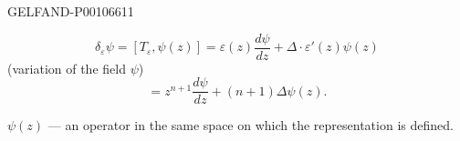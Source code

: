 \begin{GelfandAdjacentEvidence}{GELFAND-P001066}{11}

\begin{equation*}
\delta_\varepsilon\psi=[T_\varepsilon,\psi(z)]
 =\varepsilon(z)\frac{d\psi}{dz}+\Delta\cdot\varepsilon'(z)\psi(z)
\tag{21}
\end{equation*}
(variation of the field \(\psi\))
\begin{equation*}
[L_n,\psi(z)]
 =z^{n+1}\frac{d\psi}{dz}+(n+1)\Delta\psi(z).
\tag{22}
\end{equation*}
\end{GelfandAdjacentEvidence}


\(\psi(z)\) — an operator in the same space on which the representation is defined.


